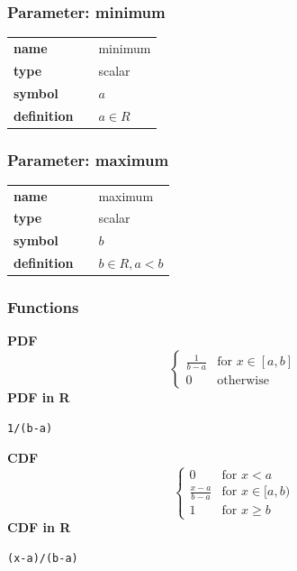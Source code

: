 \subsubsection*{Parameter: minimum}

\noindent\begin{tabular}{p{2cm}cl}
\textbf{name} & & minimum \\
\textbf{type} & & scalar \\
\textbf{symbol} & & $a$  \\
\textbf{definition} & & $a \in  R$
\end{tabular}
\subsubsection*{Parameter: maximum}

\noindent\begin{tabular}{p{2cm}cl}
\textbf{name} & & maximum \\
\textbf{type} & & scalar \\
\textbf{symbol} & & $b$  \\
\textbf{definition} & & $b \in R, a < b$
\end{tabular}
\subsubsection*{Functions}

\smallskip \noindent \hspace{.2cm} \textbf{PDF} 
\begin{equation*}\begin{cases}
                  \frac{1}{b - a} & \text{for } x \in [a,b]  \\
                  0               & \text{otherwise}
                \end{cases}\end{equation*}
\smallskip \noindent \hspace{.2cm} \textbf{PDF in R}  
\begin{verbatim}1/(b-a)\end{verbatim}
\smallskip \noindent \hspace{.2cm} \textbf{CDF} 
\begin{equation*}\begin{cases}
                  0               & \text{for } x < a \\
                  \frac{x-a}{b-a} & \text{for } x \in [a,b) \\
                  1               & \text{for } x \ge b
                \end{cases}\end{equation*}
\smallskip \noindent \hspace{.2cm} \textbf{CDF in R} 
\begin{verbatim}(x-a)/(b-a)\end{verbatim}
\smallskip
